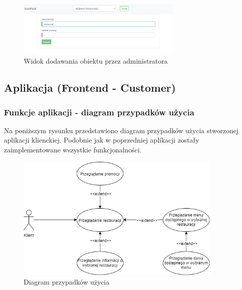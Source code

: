 \documentclass{article}
\begin{document}
			\begin{figure}[hbt!]
				\includegraphics[width=8cm]{Files/Pictures/Add_A}
				\centering
				\caption{Widok dodawania obiektu przez administratora}
			\end{figure}

	\newpage
	\subsection{Aplikacja (Frontend - Customer)}

		\subsubsection{Funkcje aplikacji - diagram przypadków użycia}
		Na poniższym rysunku przedstawiono diagram przypadków użycia stworzonej aplikacji klienckiej. Podobnie jak w poprzedniej aplikacji zostały zaimplementowane wszystkie funkcjonalności.
			\begin{figure}[hbt!]
				\includegraphics[width=10cm]{Files/Pictures/UMLCustomerApp}
				\centering
				\caption{Diagram przypadków użycia}
			\end{figure}
\end{document}
